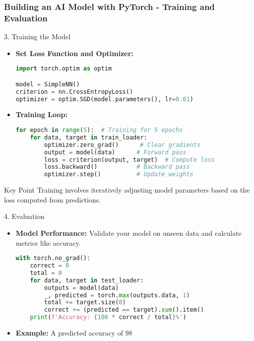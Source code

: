 \documentclass[aspectratio=169]{beamer}
\begin{document}
\begin{frame}[fragile]
    \frametitle{Building an AI Model with PyTorch - Training and Evaluation}
    \begin{block}{3. Training the Model}
        \begin{itemize}
            \item \textbf{Set Loss Function and Optimizer:}
            \begin{lstlisting}[language=Python]
import torch.optim as optim

model = SimpleNN()
criterion = nn.CrossEntropyLoss()
optimizer = optim.SGD(model.parameters(), lr=0.01)
            \end{lstlisting}
            
            \item \textbf{Training Loop:}
            \begin{lstlisting}[language=Python]
for epoch in range(5):  # Training for 5 epochs
    for data, target in train_loader:
        optimizer.zero_grad()      # Clear gradients
        output = model(data)      # Forward pass
        loss = criterion(output, target)  # Compute loss
        loss.backward()           # Backward pass
        optimizer.step()          # Update weights
            \end{lstlisting}
        \end{itemize}
        
        \begin{block}{Key Point}
            Training involves iteratively adjusting model parameters based on the loss computed from predictions.
        \end{block}
    \end{block}

    \begin{block}{4. Evaluation}
        \begin{itemize}
            \item \textbf{Model Performance:}
            Validate your model on unseen data and calculate metrics like accuracy.
            \begin{lstlisting}[language=Python]
with torch.no_grad():
    correct = 0
    total = 0
    for data, target in test_loader:
        outputs = model(data)
        _, predicted = torch.max(outputs.data, 1)
        total += target.size(0)
        correct += (predicted == target).sum().item()
    print(f'Accuracy: {100 * correct / total}%')
            \end{lstlisting}
            \item \textbf{Example:}
            A predicted accuracy of 98%
        \end{itemize}
    \end{block}
\end{frame}
\end{document}
